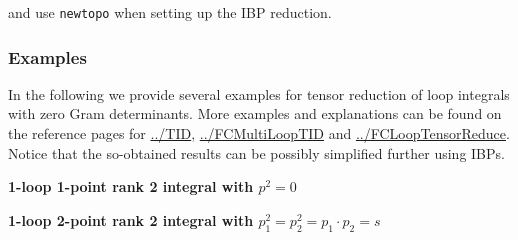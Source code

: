 \documentclass[../FeynCalcManual.tex]{subfiles}
\begin{document}
and use \texttt{newtopo} when setting up the IBP reduction.

\subsubsection{Examples}\label{examples}

In the following we provide several examples for tensor reduction of
loop integrals with zero Gram determinants. More examples and
explanations can be found on the reference pages for
\hyperlink{../tid}{../TID},
\hyperlink{../fcmultilooptid}{../FCMultiLoopTID} and
\hyperlink{../fclooptensorreduce}{../FCLoopTensorReduce}. Notice that
the so-obtained results can be possibly simplified further using IBPs.

\textbf{1-loop 1-point rank 2 integral with \(p^2=0\)}

\begin{Shaded}
\begin{Highlighting}[]
\OperatorTok{[]}
\OperatorTok{[}\OperatorTok{]} \ExtensionTok{=} \NormalTok{;}
\ExtensionTok{=}\OperatorTok{[}\OperatorTok{,}\OperatorTok{]}\OperatorTok{[}\OperatorTok{,}\OperatorTok{]}\OperatorTok{[\{}\OperatorTok{,} \OperatorTok{\},} \OperatorTok{\{} \SpecialCharTok{{-}} \OperatorTok{\}]}
\OperatorTok{[}\OperatorTok{,} \OperatorTok{,}\OtherTok{{-}\textgreater{}} \OperatorTok{\{\{}\SpecialCharTok{{-}}\OperatorTok{\}} \OtherTok{{-}\textgreater{}} \OperatorTok{\{}\SpecialCharTok{{-}}\OperatorTok{,} \OperatorTok{\}\},}\OtherTok{{-}\textgreater{}} \OperatorTok{\{}\OperatorTok{\}]}
\end{Highlighting}
\end{Shaded}

\textbf{1-loop 2-point rank 2 integral with
\(p_1^2=p_2^2 = p_1 \cdot p_2 = s\)}
\end{document}
